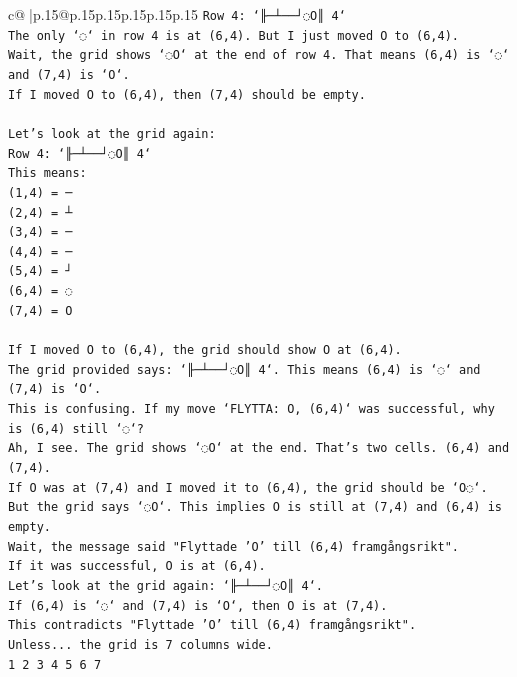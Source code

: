 \documentclass{article}
\begin{document}
{\begin{supertabular}{c@{$\;$}|p{.15\linewidth}@{}p{.15\linewidth}p{.15\linewidth}p{.15\linewidth}p{.15\linewidth}p{.15\linewidth}}
{{{\texttt{Row 4: `╟─┴──┘◌O║ 4`} \\
\texttt{The only `◌` in row 4 is at (6,4). But I just moved O to (6,4).} \\
\texttt{Wait, the grid shows `◌O` at the end of row 4. That means (6,4) is `◌` and (7,4) is `O`.} \\
\texttt{If I moved O to (6,4), then (7,4) should be empty.} \\
\\ 
\texttt{Let's look at the grid again:} \\
\texttt{Row 4: `╟─┴──┘◌O║ 4`} \\
\texttt{This means:} \\
\texttt{(1,4) = ─} \\
\texttt{(2,4) = ┴} \\
\texttt{(3,4) = ─} \\
\texttt{(4,4) = ─} \\
\texttt{(5,4) = ┘} \\
\texttt{(6,4) = ◌} \\
\texttt{(7,4) = O} \\
\\ 
\texttt{If I moved O to (6,4), the grid should show O at (6,4).} \\
\texttt{The grid provided says: `╟─┴──┘◌O║ 4`. This means (6,4) is `◌` and (7,4) is `O`.} \\
\texttt{This is confusing. If my move `FLYTTA: O, (6,4)` was successful, why is (6,4) still `◌`?} \\
\texttt{Ah, I see. The grid shows `◌O` at the end. That's two cells. (6,4) and (7,4).} \\
\texttt{If O was at (7,4) and I moved it to (6,4), the grid should be `O◌`.} \\
\texttt{But the grid says `◌O`. This implies O is still at (7,4) and (6,4) is empty.} \\
\texttt{Wait, the message said "Flyttade 'O' till (6,4) framgångsrikt".} \\
\texttt{If it was successful, O is at (6,4).} \\
\texttt{Let's look at the grid again: `╟─┴──┘◌O║ 4`.} \\
\texttt{If (6,4) is `◌` and (7,4) is `O`, then O is at (7,4).} \\
\texttt{This contradicts "Flyttade 'O' till (6,4) framgångsrikt".} \\
\texttt{Unless... the grid is 7 columns wide.} \\
\texttt{1 2 3 4 5 6 7} \\
}}}
\end{supertabular}}
\end{document}

